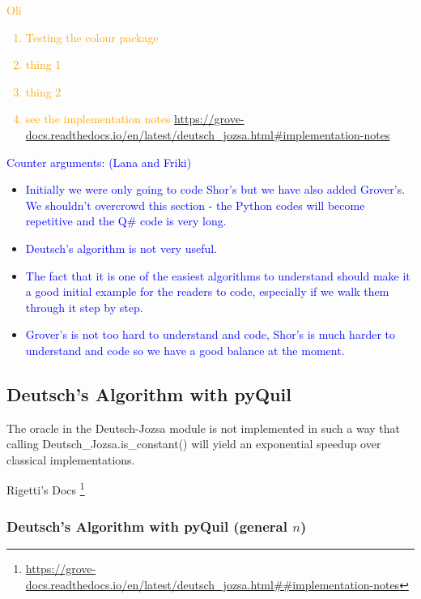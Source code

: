 \textcolor{orange}{Oli
\begin{enumerate}
    \item Testing the colour package
    \item thing 1
    \item thing 2
    \item see the implementation notes \url{https://grove-docs.readthedocs.io/en/latest/deutsch_jozsa.html#implementation-notes}
\end{enumerate}
}

\textcolor{blue}{Counter arguments: (Lana and Friki)}
\begin{itemize}
    \item \textcolor{blue}{Initially we were only going to code Shor's but we have also added Grover's. We shouldn't overcrowd this section - the Python codes will become repetitive and the Q\# code is very long.}
    \item \textcolor{blue}{Deutsch's algorithm is not very useful.}
    \item \textcolor{blue}{The fact that it is one of the easiest algorithms to understand should make it a good initial example for the readers to code, especially if we walk them through it step by step.}
    \item \textcolor{blue}{Grover's is not too hard to understand and code, Shor's is much harder to understand and code so we have a good balance at the moment.}
\end{itemize}


\subsection{Deutsch's Algorithm with pyQuil} 
\epigraph{The oracle in the Deutsch-Jozsa module is not implemented in such a way that calling Deutsch\_Jozsa.is\_constant() will yield an exponential speedup over classical implementations.}{Rigetti's Docs \footnote{\url{https://grove-docs.readthedocs.io/en/latest/deutsch_jozsa.html##implementation-notes}} }

\subsubsection{Deutsch's Algorithm with pyQuil (general $n$)}

